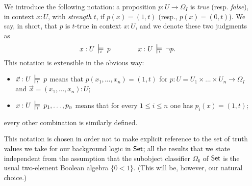 We introduce the following notation: a proposition $p : U \to \Omega_I$ is \emph{true} (resp. \emph{false}), in context $x :U$, with \emph{strength} $t$, if $p(x) =(1,t)$ (resp., $p(x)=(0,t)$). We say, in short, that $p$ is $t$-true in context $x:U$, and we denote these two judgments as 
\[x:U\entails{t} p \qquad\qquad x:U\entails{t} \lnot p.\]
This notation is extensible in the obvious way: 
\begin{itemize}
  \item $\vec x : U \entails{t} p$ means that $p(x_1,\dots,x_n) = (1,t)$ for $p : U= U_1\times\dots\times U_n\to \Omega_I$ and $\vec x = (x_1,\dots,x_n) : U$;
  \item $x : U \entails{t} p_1,\dots, p_n$ means that for every $1\le i \le n$ one has $p_i(x)=(1,t)$;
\end{itemize}
every other combination is similarly defined. 

This notation is chosen in order not to make explicit reference to the set of truth values we take for our background logic in $\mathsf{Set}$; all the results that we state independent from the assumption that the subobject classifier $\Omega_0$ of $\mathsf{Set}$ is the usual two-element Boolean algebra $\{0 < 1\}$. (This will be, however, our natural choice.)

